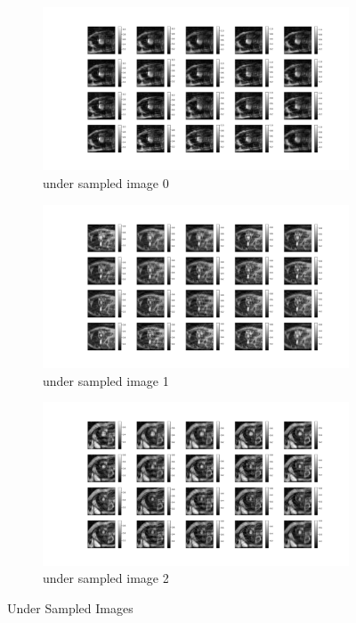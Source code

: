 \documentclass{article}
\begin{document}
\begin{figure}[ht]
  \centering
  \begin{subfigure}[b]{0.8\linewidth}
    \includegraphics[width=\linewidth]{../images/output/under_sampling/under_sampling_0.png}
    \caption{under sampled image 0}
  \end{subfigure}
  \quad
  \begin{subfigure}[b]{0.8\linewidth}
    \includegraphics[width=\linewidth]{../images/output/under_sampling/under_sampling_1.png}
    \caption{under sampled image 1}
  \end{subfigure}
  \quad
  \begin{subfigure}[b]{0.8\linewidth}
    \includegraphics[width=\linewidth]{../images/output/under_sampling/under_sampling_2.png}
    \caption{under sampled image 2}
  \end{subfigure}
  \caption{Under Sampled Images}
\end{figure}
\end{document}
